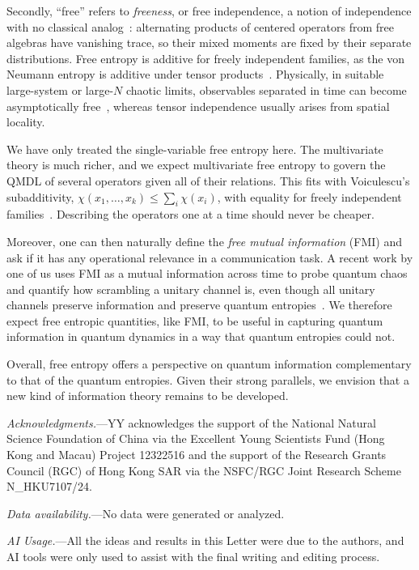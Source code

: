 \documentclass[aps,prl,twocolumn,superscriptaddress,amsmath,amssymb,reprint,longbibliography]{revtex4-2}
\begin{document}
Secondly, ``free'' refers to \emph{freeness}, or free independence, a notion of independence with no classical analog~\cite{speicher1996universal}: alternating products of centered operators from free algebras have vanishing trace, so their mixed moments are fixed by their separate distributions. Free entropy is additive for freely independent families, as the von Neumann entropy is additive under tensor products~\cite{voiculescu1994analogues}. Physically, in suitable large-system or large-$N$ chaotic limits, observables separated in time can become asymptotically free~\cite{vardhan2025}, whereas tensor independence usually arises from spatial locality.

We have only treated the single-variable free entropy here. The multivariate theory is much richer, and we expect multivariate free entropy to govern the QMDL of several operators given all of their relations. This fits with Voiculescu's subadditivity, $\chi(x_1,\dots,x_k)\le\sum_i\chi(x_i)$, with equality for freely independent families~\cite{voiculescu1994analogues}. Describing the operators one at a time should never be cheaper.

Moreover, one can then naturally define the \emph{free mutual information} (FMI) and ask if it has any operational relevance in a communication task. A recent work by one of us uses FMI as a mutual information across time to probe quantum chaos and quantify how scrambling a unitary channel is, even though all unitary channels preserve information and preserve quantum entropies~\cite{vardhan2025}. We therefore expect free entropic quantities, like FMI, to be useful in capturing quantum information in quantum dynamics in a way that quantum entropies could not.

Overall, free entropy offers a perspective on quantum information complementary to that of the quantum entropies. Given their strong parallels, we envision that a new kind of information theory remains to be developed.

\par\noindent
\emph{Acknowledgments.}---YY acknowledges the support of the National Natural Science Foundation of China via the Excellent Young Scientists Fund (Hong Kong and Macau) Project 12322516 and the support of the Research Grants Council (RGC) of Hong Kong SAR via the NSFC/RGC Joint Research Scheme N\_HKU7107/24.
\par\noindent
\emph{Data availability.}---No data were generated or analyzed.

\par\noindent
\emph{AI Usage.}---All the ideas and results in this Letter were due to the authors, and AI tools were only used to assist with the final writing and editing process.

\end{document}

